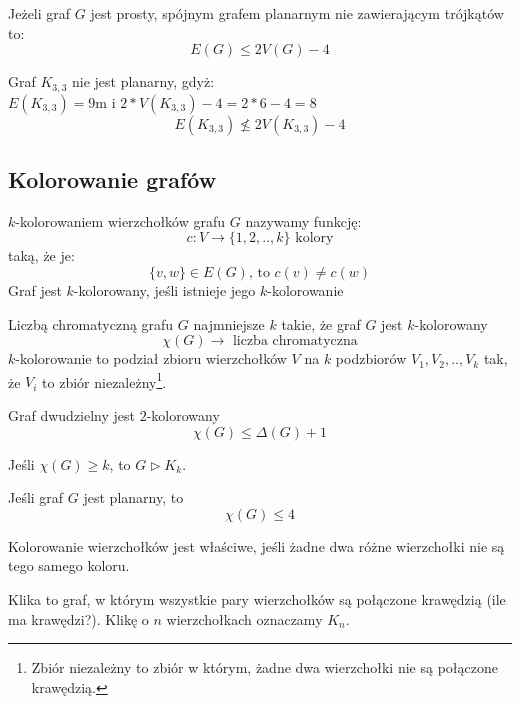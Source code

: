 \begin{theorem}
Jeżeli graf $G$ jest prosty, spójnym grafem planarnym nie zawierającym trójkątów to:
$$E(G) \leq 2 V(G) - 4$$
\end{theorem}
\begin{remark}
Graf $K_{3,3}$ nie jest planarny, gdyż: \\
$E(K_{3,3})= 9$m i $2*V(K_{3,3})-4=2*6-4=8$
$$E(K_{3,3})\not \leq 2V(K_{3,3})-4$$
\end{remark}

\subsection{Kolorowanie grafów}
\begin{definition}[$k$-kolorowanie] 
$k$-kolorowaniem wierzchołków grafu $G$ nazywamy funkcję: 
$$c: V\rightarrow\{1,2,..,k\} \text{ kolory}$$
taką, że je:
$$\{v,w\}\in E(G)\text{, to } c(v)\neq c(w)$$
Graf jest $k$-kolorowany, jeśli istnieje jego $k$-kolorowanie
\end{definition}

\begin{definition}
Liczbą chromatyczną grafu $G$ najmniejsze $k$ takie, że graf $G$ jest $k$-kolorowany
$$\chi (G)\rightarrow\text{ liczba chromatyczna}$$
$k$-kolorowanie to podział zbioru wierzchołków $V$ na $k$ podzbiorów $V_1, V_2,..,V_k$ tak, że $V_i$ to zbiór niezależny\footnote{Zbiór niezależny to zbiór w którym, żadne dwa wierzchołki nie są połączone krawędzią.}.
\end{definition}
\begin{remark}
Graf dwudzielny jest $2$-kolorowany
$$\chi (G) \leq \Delta (G)+1$$
\end{remark}

\begin{hipoterm}[Hadwigera]
Jeśli $\chi (G)\geq k$, to $G\triangleright K_k$.
\end{hipoterm}

\begin{theorem}\label{the:4barwy} 
Jeśli graf $G$ jest planarny, to $$\chi (G) \leq 4$$
\end{theorem}

\begin{definition}
Kolorowanie wierzchołków jest właściwe, jeśli żadne dwa różne wierzchołki nie są tego samego koloru.
\end{definition}

\begin{definition}[Klika] 
Klika to graf, w którym wszystkie pary wierzchołków są połączone krawędzią (ile ma krawędzi?). Klikę o $n$ wierzchołkach oznaczamy $K_n$.
\end{definition}

